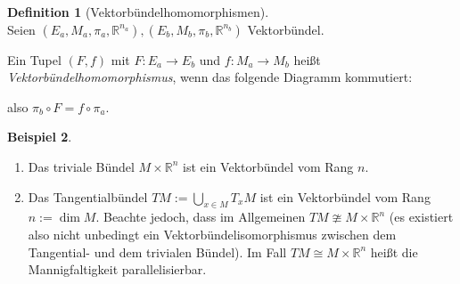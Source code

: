 \documentclass[a4paper]{scrreprt}
\numberwithin{equation}{chapter}
\newcommand{\R}{\mathbb{R}}
\theoremstyle{definition}
\newtheorem{defn}{Definition}[section]
\newtheorem{bsp}[defn]{Beispiel}
\begin{document}
		\begin{defn}[Vektorbündelhomomorphismen]\hfill\\
			Seien $(E_a,M_a,\pi_a,\R^{n_a}),(E_b,M_b,\pi_b,\R^{n_b})$ Vektorbündel.
			
			Ein Tupel $(F,f)$ mit $F\colon E_a\rightarrow E_b$ und $f\colon M_a\rightarrow M_b$ heißt \emph{Vektorbündelhomomorphismus}, wenn das folgende Diagramm kommutiert:
			\begin{center}
			\end{center}
			also $\pi_b\circ F=f\circ\pi_a$.
		\end{defn}
		\begin{bsp}\hfill
			\begin{enumerate}
				\item Das triviale Bündel $M\times \R^n$ ist ein Vektorbündel vom Rang $n$.
				\item Das Tangentialbündel $TM:=\bigcup_{x\in M}T_xM$ ist ein Vektorbündel vom Rang $n:=\dim M$. Beachte jedoch, dass im Allgemeinen $TM\ncong M\times \R^n$ (es existiert also nicht unbedingt ein Vektorbündelisomorphismus zwischen dem Tangential- und dem trivialen Bündel). Im Fall $TM\cong M\times \R^n$ heißt die Mannigfaltigkeit parallelisierbar.
			\end{enumerate}
		\end{bsp}
\end{document}
